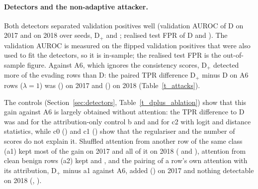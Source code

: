 \paragraph{Detectors and the non-adaptive attacker.}
Both detectors separated validation positives well (validation AUROC of D \valAurocDSeventeenRange{} on 2017 and
\valAurocDEighteenRange{} on 2018 over seeds, D$_+$ \valAurocDplusSeventeenRange{} and \valAurocDplusEighteenRange;
realised test FPR of D \testFprDSeventeenRange{} and \testFprDEighteenRange).
The validation AUROC is measured on the flipped validation positives that were also used to fit the detectors, so it
is in-sample; the realised test FPR is the out-of-sample figure.
Against A6, which ignores the consistency scores, D$_+$ detected more of the evading rows than D: the paired TPR
difference D$_+$ minus D on A6 rows ($\lambda = 1$) was \tprAsixOneVoneSeventeen{} (\tprAsixOneVoneSeventeenCI) on 2017
and \tprAsixOneVoneEighteen{} (\tprAsixOneVoneEighteenCI) on 2018 (Table~\ref{t_attacks}).



The controls (Section~\ref{sec:detectors}, Table~\ref{t_dplus_ablation}) show that this gain against A6 is largely
obtained without attention: the TPR difference to D was \ablBMinusDSeventeen{} and \ablBMinusDEighteen{} for the
attribution-only control b and \ablCtwoMinusDSeventeen{} and \ablCtwoMinusDEighteen{} for c2 with logit and distance
statistics, while c0 (\ablCzeroMinusDSeventeen) and c1 (\ablConeMinusDSeventeen) show that the regulariser and the
number of scores do not explain it.
Shuffled attention from another row of the same class (a1) kept most of the gain on 2017 and all of it on 2018
(\ablAoneMinusDSeventeen{} and \ablAoneMinusDEighteen), attention from clean benign rows (a2) kept
\ablAtwoMinusDSeventeen{} and \ablAtwoMinusDEighteen, and the pairing of a row's own attention with its attribution,
D$_+$ minus a1 against A6, added \ablPairSeventeen{} (\ablPairSeventeenCI) on 2017 and nothing detectable on 2018
(\ablPairEighteen, \ablPairEighteenCI).



